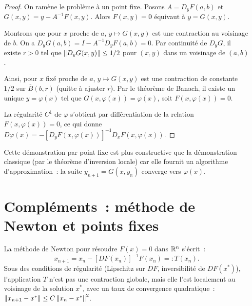 \begin{proof}
On ram\`ene le probl\`eme \`a un point fixe. Posons $A = D_y F(a,b)$ et
$G(x,y) = y - A^{-1} F(x,y)$. Alors $F(x,y) = 0$ \'equivaut \`a $y = G(x,y)$.

Montrons que pour $x$ proche de $a$, $y \mapsto G(x,y)$ est une contraction au voisinage
de $b$. On a $D_y G(a,b) = I - A^{-1} D_y F(a,b) = 0$. Par continuit\'e de $D_y G$, il
existe $r > 0$ tel que $\left\| D_y G(x,y) \right\| \leq 1/2$ pour $(x,y)$ dans un voisinage de
$(a,b)$.

Ainsi, pour $x$ fix\'e proche de $a$, $y \mapsto G(x,y)$ est une contraction de constante
$1/2$ sur $\overline{B}(b, r)$ (quitte \`a ajuster $r$). Par le th\'eor\`eme de Banach,
il existe un unique $y = \varphi(x)$ tel que $G(x, \varphi(x)) = \varphi(x)$, soit
$F(x, \varphi(x)) = 0$.

La r\'egularit\'e $C^1$ de $\varphi$ s'obtient par diff\'erentiation de la relation
$F(x, \varphi(x)) = 0$, ce qui donne
$D\varphi(x) = -[D_y F(x, \varphi(x))]^{-1} D_x F(x, \varphi(x))$.
\end{proof}

\begin{remarque}
Cette d\'emonstration par point fixe est plus constructive que la d\'emonstration classique
(par le th\'eor\`eme d'inversion locale) car elle fournit un algorithme d'approximation~:
la suite $y_{n+1} = G(x, y_n)$ converge vers $\varphi(x)$.
\end{remarque}

\section{Compl\'ements~: m\'ethode de Newton et points fixes}

\begin{proposition}
La m\'ethode de Newton pour r\'esoudre $F(x) = 0$ dans $\mathbb{R}^n$ s'\'ecrit~:
\[
  x_{n+1} = x_n - [DF(x_n)]^{-1} F(x_n) =: T(x_n).
\]
Sous des conditions de r\'egularit\'e (Lipschitz sur $DF$, inversibilit\'e de $DF(x^*)$),
l'application $T$ n'est pas une contraction globale, mais elle l'est localement au
voisinage de la solution $x^*$, avec un taux de convergence quadratique~:
$\left\| x_{n+1} - x^* \right\| \leq C \left\| x_n - x^* \right\|^2$.
\end{proposition}

